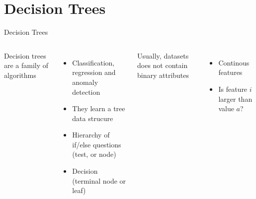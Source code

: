 \documentclass[10pt,compress]{beamer} %
\begin{document}
\section{Decision Trees}
\begin{frame}{Decision Trees}
    \begin{columns}
            Decision trees are a family of algorithms
            \begin{itemize}
                \item Classification, regression and anomaly detection
                \item They learn a tree data strucure
                \item Hierarchy of if/else questions (test, or node)
                \item Decision (terminal node or leaf)
            \end{itemize}

            Usually, datasets does not contain binary attributes
            \begin{itemize}
                \item Continous features
                \item Is feature $i$ larger than value $a$?
            \end{itemize}


\end{columns}
\end{frame}
\end{document}
